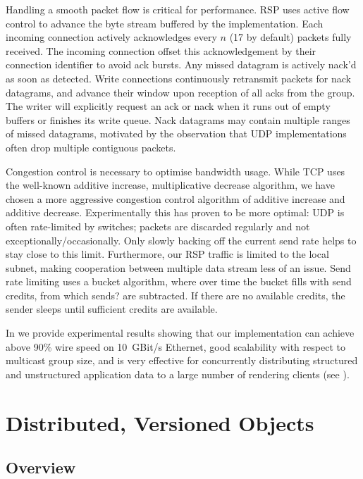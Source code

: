Handling a smooth packet flow is critical for performance. RSP uses active flow
control to advance the byte stream buffered by the implementation. Each incoming
connection actively acknowledges every $n$ (17 by default) packets fully
received. The incoming connection offset this acknowledgement by their
connection identifier to avoid ack bursts. Any missed datagram is actively
nack'd as soon as detected. Write connections continuously retransmit packets
for nack datagrams, and advance their window upon reception of all acks from the
group. The writer will explicitly request an ack or nack when it runs out of
empty buffers or finishes its write queue. Nack datagrams may contain multiple
ranges of missed datagrams, motivated by the observation that UDP
implementations often drop multiple contiguous packets.

Congestion control is necessary to optimise bandwidth usage. While TCP uses the
well-known additive increase, multiplicative decrease algorithm, we have chosen
a more aggressive congestion control algorithm of additive increase and additive
decrease. Experimentally this has proven to be more optimal: UDP is often
rate-limited by switches; packets are discarded regularly and not
exceptionally/occasionally. Only slowly backing off the current send rate helps to stay close
to this limit. Furthermore, our RSP traffic is limited to the local subnet,
making cooperation between multiple data stream less of an issue. Send rate
limiting uses a bucket algorithm, where over time the bucket fills with send
credits, from which sends? are subtracted. If there are no available credits,
the sender sleeps until sufficient credits are available.

In \cite{ESP:18} we provide experimental results showing that our
implementation can achieve above 90\% wire speed on 10~GBit/s Ethernet,
good scalability with respect to multicast group size, and is very effective
for concurrently distributing structured and unstructured application data to a large number
of rendering clients (see ).


\section{Distributed, Versioned Objects}

\subsection{Overview}

